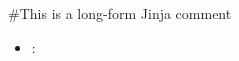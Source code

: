 \documentclass{article}
\begin{document}
\section{}
\#{This is a long-form Jinja comment}
\begin{itemize}
  \item {} : 
\end{itemize}
\end{document}
